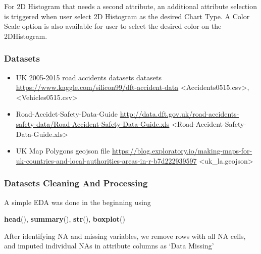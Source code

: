 \documentclass[]{article}
\newenvironment{Shaded}{\begin{snugshade}}{\end{snugshade}}
\newcommand{\KeywordTok}[1]{\textcolor[rgb]{0.13,0.29,0.53}{\textbf{#1}}}
\newcommand{\NormalTok}[1]{#1}
\begin{document}
For 2D Histogram that needs a second attribute, an additional attribute
selection is triggered when user select 2D Histogram as the desired
Chart Type. A Color Scale option is also available for user to select
the desired color on the 2DHistogram.

\subsubsection{Datasets}\label{datasets}

\begin{itemize}
\item
  UK 2005-2015 road accidents datasets datasets
  \url{https://www.kaggle.com/silicon99/dft-accident-data}
  \textless{}Accidents0515.csv\textgreater{},\textless{}Vehicles0515.csv\textgreater{}
\item
  Road-Accidet-Safety-Data-Guide
  \url{http://data.dft.gov.uk/road-accidents-safety-data/Road-Accident-Safety-Data-Guide.xls}
  \textless{}Road-Accident-Safety-Data-Guide.xls\textgreater{}
\item
  UK Map Polygons geojson file
  \url{https://blog.exploratory.io/making-maps-for-uk-countries-and-local-authorities-areas-in-r-b7d222939597}
  \textless{}uk\_la.geojson\textgreater{}
\end{itemize}

\subsubsection{Datasets Cleaning And
Processing}\label{datasets-cleaning-and-processing}

A simple EDA was done in the beginning using

\begin{Shaded}
\begin{Highlighting}[]
\KeywordTok{head}\NormalTok{(), }\KeywordTok{summary}\NormalTok{(), }\KeywordTok{str}\NormalTok{(), }\KeywordTok{boxplot}\NormalTok{()}
\end{Highlighting}
\end{Shaded}

After identifying NA and missing variables, we remove rows with all NA
cells, and imputed individual NAs in attribute columns as `Data Missing'
\end{document}
